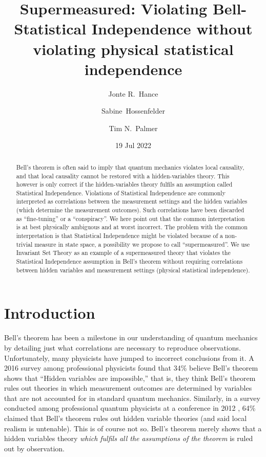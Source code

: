 \documentclass[12pt]{article}
\begin{document}
\title{Supermeasured: Violating Bell-Statistical Independence without violating physical statistical independence}
\author[1,*]{Jonte R.\ Hance}
\author[2]{Sabine\ Hossenfelder}
\author[3,$\dagger$]{Tim N.\ Palmer}
\date{19 Jul 2022}

\maketitle

\begin{abstract}
Bell's theorem is often said to imply that quantum mechanics violates local causality, and that local causality cannot be restored with a hidden-variables theory. This however is only correct if the hidden-variables theory fulfils an assumption called Statistical Independence. Violations of Statistical Independence are commonly interpreted as correlations between the measurement settings and the hidden variables (which determine the measurement outcomes). Such correlations have been discarded as ``fine-tuning'' or a ``conspiracy''. We here point out that the common interpretation is at best physically ambiguous and at worst incorrect. The problem with the common interpretation is that Statistical Independence might be violated because of a non-trivial measure in state space, a possibility we propose to call ``supermeasured''. We use Invariant Set Theory as an example of a supermeasured theory that violates the Statistical Independence assumption in Bell's theorem without requiring correlations between hidden variables and measurement settings (physical statistical independence). 
\end{abstract}

\section{Introduction}
\label{intro}
Bell's theorem \cite{Bell1964OnEPR} has been a milestone in our understanding of quantum mechanics by detailing just what correlations are necessary to reproduce observations. Unfortunately, many physicists have jumped to incorrect conclusions from it. A 2016 survey among professional physicists \cite{Sujeevan2016Survey} found that 34\% believe Bell's theorem shows that ``Hidden variables are impossible,'' that is, they think Bell's theorem rules out theories in which measurement outcomes are determined by variables that are not accounted for in standard quantum mechanics. Similarly, in a survey conducted among professional quantum physicists at a conference in 2012 \cite{Schlosshauer2013Attitudes}, 64\% claimed that Bell's theorem rules out hidden variable theories (and said local realism is untenable). This is of course not so. Bell's theorem merely shows that a hidden variables theory {\emph{which fulfils all the assumptions of the theorem}} is ruled out by observation.
\end{document}
